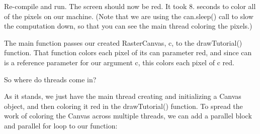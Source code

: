 \begin{DoxyCode}{0}
\DoxyCodeLine{\textcolor{preprocessor}{\#include <tsgl.h>}}
\DoxyCodeLine{}
\DoxyCodeLine{      \}}
\DoxyCodeLine{   \}}
\DoxyCodeLine{\}}
\DoxyCodeLine{}
\DoxyCodeLine{}
\DoxyCodeLine{}
\DoxyCodeLine{\}}
\end{DoxyCode}


Re-\/compile and run. The screen should now be red. It took 8. seconds to color all of the pixels on our machine. (Note that we are using the {\ttfamily can.\+sleep()} call to slow the computation down, so that you can see the main thread coloring the pixels.)

The main function passes our created Raster\+Canvas, {\ttfamily c}, to the {\ttfamily draw\+Tutorial()} function. That function colors each pixel of its {\ttfamily can} parameter red, and since {\ttfamily can} is a reference parameter for our argument {\ttfamily c}, this colors each pixel of {\ttfamily c} red.

So where do threads come in?

As it stands, we just have the main thread creating and initializing a Canvas object, and then coloring it red in the {\ttfamily draw\+Tutorial()} function. To spread the work of coloring the Canvas across multiple threads, we can add a parallel block and parallel {\ttfamily for} loop to our function\+:


